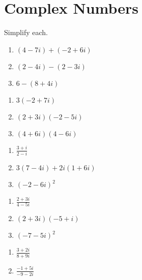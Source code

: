 \chapter{Complex Numbers}

Simplify each.

\begin{multicols}{3}
\begin{enumerate}
	\item $(4-7i)+(-2+6i)$
	\item $(2-4i)-(2-3i)$
	\item $6 - (8 + 4i)$
\end{enumerate}	\setcounter{Review}{\value{enumi}}
\end{multicols}

\begin{multicols}{3}
\begin{enumerate}		\setcounter{enumi}{\value{Review}}
	\item $3(-2 + 7i)$
	\item $(2+3i)(-2-5i)$
	\item $(4+6i)(4-6i)$
\end{enumerate}	\setcounter{Review}{\value{enumi}}
\end{multicols}

\begin{multicols}{3}
\begin{enumerate}		\setcounter{enumi}{\value{Review}}
	\item $\frac{3+i}{2-i}$
	\item $3(7-4i)+2i(1+6i)$
	\item $(-2-6i)^2$
\end{enumerate}	\setcounter{Review}{\value{enumi}}
\end{multicols}

\begin{multicols}{3}
\begin{enumerate}		\setcounter{enumi}{\value{Review}}
	\item $\frac{2+3i}{4-5i}$
	\item $(2+3i)(-5+i)$
	\item $(-7 - 5i)^2$
\end{enumerate}	\setcounter{Review}{\value{enumi}}
\end{multicols}

\begin{multicols}{3}
\begin{enumerate}		\setcounter{enumi}{\value{Review}}
	\item $\frac{3+2i}{8+9i}$
	\item $\frac{-1+5i}{-9-2i}$
\end{enumerate}	\setcounter{Review}{\value{enumi}}
\end{multicols}


